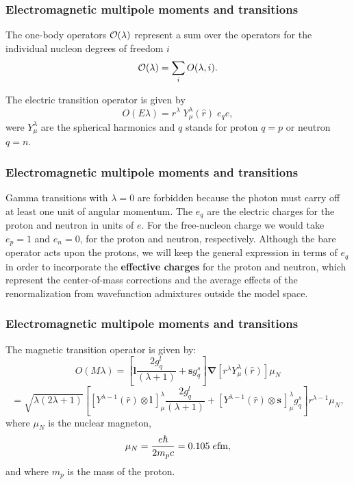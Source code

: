 \documentclass{beamer}
\begin{document}
\begin{frame}
\frametitle{Electromagnetic multipole moments and transitions}

\begin{block}{}
The one-body operators ${\cal O}(\lambda)$ represent a sum over
the operators for the individual nucleon degrees of freedom  $i$
\[
{\cal O}(\lambda ) = \sum_{i} O(\lambda ,i). 
\]

The electric transition operator is given by
\[
O(E\lambda ) = r^{\lambda } \; Y^{\lambda }_{\mu }(\hat{r}) \; e_{q} e, 
\]
were $Y^{\lambda }_{\mu }$ are the spherical harmonics
and $q$ stands for proton $q=p$ or neutron $q=n$.

\end{block}
\end{frame}

\begin{frame}
\frametitle{Electromagnetic multipole moments and transitions}

\begin{block}{}
Gamma transitions
with $\lambda=0$ are forbidden because the photon must carry off
at least one unit of angular momentum. The $e_{q}$
are the electric charges for the proton and neutron in units of $e$.
For the free-nucleon
charge we would take $e_{p}=1$ and $e_{n}=0$, for the
proton and neutron, respectively.
Although the bare operator acts upon the protons,
we will keep the general expression in terms of $e_{q}$ in order
to incorporate the \textbf{effective charges} for the proton and
neutron, which represent the center-of-mass corrections and the
average effects of the renormalization from wavefunction
admixtures outside the model space.
\end{block}
\end{frame}

\begin{frame}
\frametitle{Electromagnetic multipole moments and transitions}

\begin{block}{}
The magnetic transition operator is given by:
\[
O(M\lambda)=\left[\mathbf{l}\frac{2g^{l }_{q}}{(\lambda +1)}+ \mathbf{s}g^{s}_{q}\right]\mathbf{\nabla}[r^{\lambda }Y^{\lambda }_{\mu }(\hat{r})]\mu _{N}
\]
\[
= \sqrt{\lambda (2\lambda +1)}\left[[Y^{\lambda -1}(\hat{r})\otimes \mathbf{l}\,]^{\lambda }_{\mu }\frac{2g^{l}_{q}}{(\lambda +1)}
+ [Y^{\lambda -1}(\hat{r})\otimes \mathbf{s}\,]^{\lambda }_{\mu }g^{s}_{q}\right]r^{\lambda -1}\mu _{N}, 
\]
 where $\mu_{N}$ is the nuclear magneton,
\[
\mu _{N}=\frac{e\hbar }{2m_{p}c} = 0.105 \; e {\rm fm}, 
\]
and where $m_{p}$ is the mass of the proton.
\end{block}
\end{frame}
\end{document}
